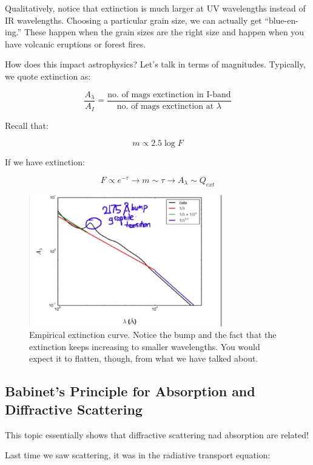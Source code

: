 \documentclass{article}
\begin{document}
Qualitatively, notice that extinction is much larger at UV wavelengths instead of IR wavelengths. Choosing a particular grain size, we can actually get ``blue-en-ing.'' These happen when the grain sizes are the right size and happen when you have volcanic eruptions or forest fires.

How does this impact astrophysics? Let's talk in terms of magnitudes. Typically, we quote extinction as:

$$
\frac{A_\lambda}{A_I} = \frac{\text{no. of mags exctinction in I-band}}{\text{no. of mags exctinction at } \lambda}
$$

Recall that:

$$
m \propto 2.5 \log F
$$

If we have extinction:

$$
F \propto e^{-\tau} \rightarrow m \sim \tau \rightarrow A_\lambda \sim Q_{ext}
$$

\begin{figure}
    \centering
    \includegraphics[width=0.75\textwidth]{Screen Shot 2020-11-14 at 4.35.57 PM.png}
    \caption{Empirical extinction curve. Notice the bump and the fact that the extinction keeps increasing to smaller wavelengths. You would expect it to flatten, though, from what we have talked about.}
    \label{fig:empiral_ext}
\end{figure}

\subsection{Babinet's Principle for Absorption and Diffractive Scattering}

This topic essentially shows that diffractive scattering nad absorption are related!

Last time we saw scattering, it was in the radiative transport equation:
\end{document}

